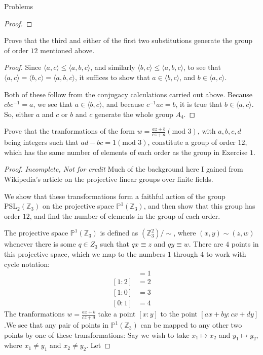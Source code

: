 \documentclass[12pt]{article}
\newcommand{\Z}{\mathbb{Z}}
\theoremstyle{definition}
\newenvironment{problem}[2][Problem]{\begin{trivlist}
\item[\hskip \labelsep {\bfseries #1}\hskip \labelsep {\bfseries #2.}]}{\end{trivlist}}
\begin{document}
\begin{section}{Problems}
\begin{problem}{1}
\begin{proof}
	\end{proof}
	Prove that the third and either of the first two substitutions generate the group of order $12$ mentioned above.
	\begin{proof}
		Since $\langle a, c\rangle \leq \langle a, b, c\rangle$, and similarly $\langle b, c\rangle \leq \langle a, b, c\rangle$, to see that $\langle a, c\rangle = \langle b, c\rangle = \langle a, b, c\rangle$, it suffices to show that $a \in \langle b, c\rangle$, and $b \in \langle a, c\rangle$.
		\par Both of these follow from the conjugacy calculations carried out above. Because $cbc^{-1} = a$, we see that $a \in \langle b,c\rangle$, and because $c^{-1}ac = b$, it is true that $b \in \langle a, c\rangle$. So, either $a$ and $c$ or $b $ and $c$ generate the whole group $A_4$.
	\end{proof}
\end{problem}
\begin{problem}{2}
	Prove that the tranformations of the form $w = \frac{az + b}{cz + d} (\text{mod }3)$, with $a, b, c, d$ being integers such that $ad - bc = 1 (\text{mod }3)$, constitute a group of order $12$, which has the same number of elements of each order as the group in Exercise $1$.
	\begin{proof}
		\textit{Incomplete, Not for credit}
	    Much of the background here I gained from Wikipedia's article on the projective linear groups over finite fields.
	    \par 	We show that these transformations form a faithful action of the group $\text{PSL}_2(\Z_3)$ on the projective space $\mathbb P^1(\Z_3)$, and then show that this group has order $12$, and find the number of elements in the group of each order.
	    \par The projective space $\mathbb P^1(\Z_3)$ is defined as $(\Z_3^2) / \sim$, where $(x,y) \sim (z, w)$ whenever there is some $q \in Z_3$ such that $qx \equiv z$ and $qy \equiv w$. There are $4$ points in this projective space, which we map to the numbers $1$ through $4$ to work with cycle notation:
		\begin{align*}
			[1:1] &= 1\\
			[1:2] &= 2\\
			[1:0] &= 3\\
			[0:1] &= 4
		\end{align*}
		The tranformations $w = \frac{az + b}{cz + d}$ take a point $[x:y]$ to the point $[ax + by: cx+dy]$.We see that any pair of points in $\mathbb P^1(\Z_3)$ can be mapped to any other two points by one of these transformations: Say we wish to take $x_1 \mapsto x_2$ and $y_1 \mapsto y_2$, where $x_1 \neq y_1$ and $x_2 \neq y_2$. Let

\end{proof}
\end{problem}
\end{section}
\end{document}

